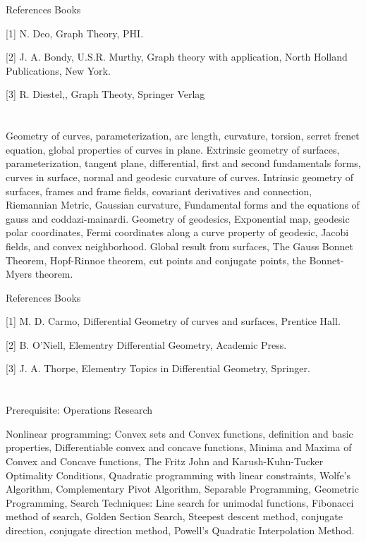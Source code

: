  

References Books  

[1]  N. Deo, Graph Theory, PHI. 

[2]  J. A. Bondy, U.S.R. Murthy, Graph theory with application, North Holland Publications, New York.  

[3]  R. Diestel,, Graph Theoty, Springer Verlag 


\section{\dsccourseinfo}
 
Geometry of curves, parameterization, arc length, curvature, torsion, serret frenet equation, global properties of curves in plane. Extrinsic geometry of surfaces, parameterization, tangent plane, differential, first and second fundamentals forms, curves in surface, normal and geodesic curvature of curves. Intrinsic geometry of surfaces, frames and frame fields, covariant derivatives and connection, Riemannian Metric, Gaussian curvature, Fundamental forms and the equations of gauss and coddazi-mainardi. Geometry of geodesics, Exponential map, geodesic polar coordinates, Fermi coordinates along a curve property of geodesic, Jacobi fields, and convex neighborhood. Global result from surfaces, The Gauss Bonnet Theorem, Hopf-Rinnoe theorem, cut points and conjugate points, the Bonnet-Myers theorem.   

 

References Books  

[1] M. D. Carmo, Differential Geometry of curves and surfaces, Prentice Hall. 

[2] B. O’Niell, Elementry Differential Geometry, Academic Press.  

[3] J. A. Thorpe, Elementry Topics in Differential Geometry, Springer. 

\section{\dsccourseinfo}

Prerequisite: Operations Research

Nonlinear programming: Convex sets and Convex functions, definition and basic properties, Differentiable convex and concave functions, Minima and Maxima of Convex and Concave functions, The Fritz John and Karush-Kuhn-Tucker Optimality Conditions, Quadratic programming with linear constraints, Wolfe’s Algorithm, Complementary Pivot Algorithm, Separable Programming, Geometric Programming, Search Techniques: Line search for unimodal functions, Fibonacci method of search, Golden Section Search, Steepest descent method, conjugate direction, conjugate direction method, Powell’s Quadratic Interpolation Method.
 

